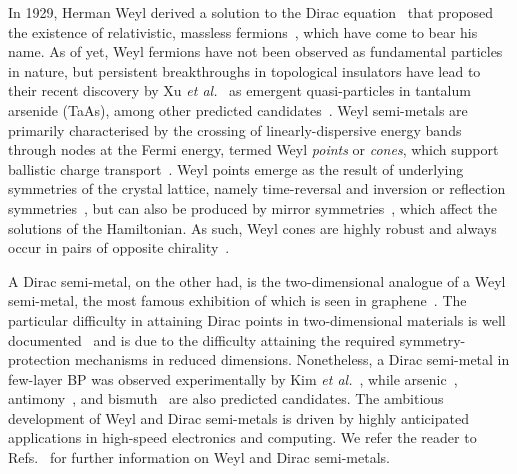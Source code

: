 In 1929, Herman Weyl derived    
a solution to the Dirac equation~\cite{dirac1928quantum} 
that proposed the existence of 
relativistic, massless fermions~\cite{Weyl1929},
which have come to bear his name.
%
As of yet, 
Weyl fermions have not been 
observed as fundamental particles in nature, 
but persistent breakthroughs in 
topological insulators have lead 
to their recent discovery     
by Xu {\it et al.}~\cite{Xuaaa9297}
as emergent quasi-particles 
in tantalum arsenide (TaAs), 
among other  
predicted candidates~\cite{PhysRevB.83.205101,PhysRevLett.107.186806,PhysRevB.89.081106}.
%
Weyl semi-metals are primarily 
characterised by the crossing 
of linearly-dispersive energy bands 
through nodes at the Fermi energy, 
termed Weyl {\it points} or {\it cones}, 
which support ballistic charge 
transport~\cite{doi:10.1146/annurev-conmatphys-031016-025458}.
%
Weyl points emerge as the result of 
underlying symmetries of the crystal lattice,
namely time-reversal and 
inversion or reflection symmetries~\cite{doi:10.1093/nsr/nwu080}, 
but can also be produced by mirror symmetries~\cite{PhysRevB.93.035401}, 
which affect the solutions of the Hamiltonian.
%
As such, 
Weyl cones are highly robust 
and always occur in pairs 
of opposite chirality~\cite{doi:10.1146/annurev-conmatphys-031016-025458}.
%

A Dirac semi-metal, 
on the other had, 
is the two-dimensional 
analogue of a Weyl semi-metal, 
the most famous exhibition of which 
is seen in graphene~\cite{PhysRevLett.115.126803}. 
%
The particular difficulty in attaining Dirac points 
in two-dimensional materials  
is well documented~\cite{C3CP53257G,doi:10.1093/nsr/nwu080} 
and is due to the difficulty attaining  
the required symmetry-protection mechanisms 
in reduced dimensions.
%
Nonetheless, 
a Dirac semi-metal in few-layer  BP 
was observed experimentally by Kim \emph{et al.}~\cite{Kim723}, 
while arsenic~\cite{doi:10.1063/1.4943548}, 
antimony~\cite{Yao2013,Lu2016,Zhao2015}, 
and bismuth~\cite{Lu2016} 
are also predicted candidates.
%
The ambitious development 
of Weyl and Dirac semi-metals 
is driven by highly anticipated applications 
in high-speed electronics and computing. 
%
We refer the reader to Refs.~\cite{Weyl1929,Xuaaa9297,PhysRevLett.108.140405,doi:10.1146/annurev-conmatphys-031016-025458,C3CP53257G,doi:10.1093/nsr/nwu080} 
for further information on 
Weyl and Dirac semi-metals.

